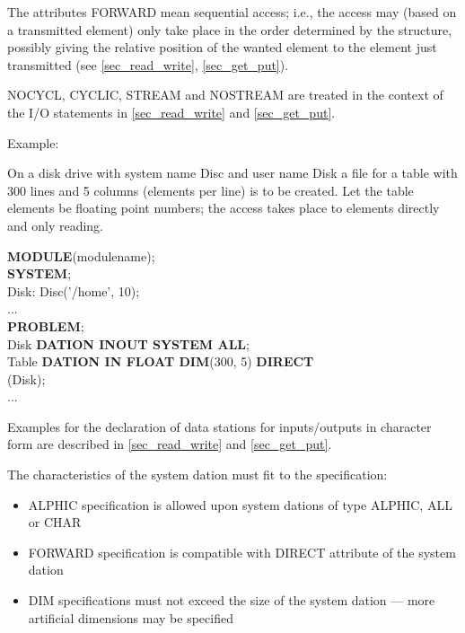 The attributes FORWARD 
 mean sequential access; i.e., the
access may (based on a transmitted element) only take place in the order
determined by the structure,
possibly giving the relative position of the wanted
element to the element just transmitted 
(see \ref{sec_read_write}, \ref{sec_get_put}).


NOCYCL, CYCLIC,
 STREAM and 
NOSTREAM are treated in the context of the
I/O statements in 
\ref{sec_read_write} and \ref{sec_get_put}.

Example:

On a disk drive with system name 
Disc
 and user name Disk a file for a
table with 300 lines and 5 columns (elements per line) is to be created.
Let the table elements be floating point numbers; the access takes place
to elements directly and only reading.

{\bf MODULE}(modulename);\\

{\bf SYSTEM};\\
\x Disk: Disc('/home', 10);\\
\x ... \\
\label{Example}
{\bf PROBLEM};\\
 Disk {\bf DATION INOUT SYSTEM ALL};\\
 Table {\bf DATION IN FLOAT DIM}(300, 5) {\bf DIRECT}\\
\x {} (Disk);\\
\x ...

Examples for the declaration of data stations for inputs/outputs in
character form are described in 
\ref{sec_read_write} and \ref{sec_get_put}.

The characteristics of the system dation must fit to the specification:
\begin{itemize}
\item ALPHIC specification is allowed upon system dations of type ALPHIC,
   ALL or CHAR
\item FORWARD specification is compatible with DIRECT attribute
   of the system dation
\item DIM specifications must not exceed the size of the system dation ---
      more artificial dimensions may be specified
\end{itemize}

